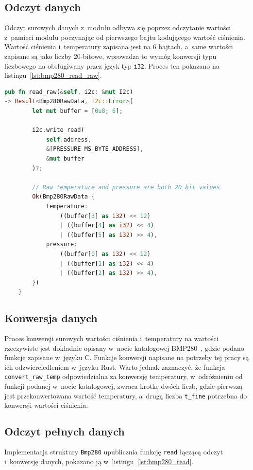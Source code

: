 \subsection*{Odczyt danych}
Odczyt surowych danych z~modułu odbywa się poprzez odczytanie wartości 
z~pamięci modułu poczynając od pierwszego bajtu kodującego wartość ciśnienia.
Wartość ciśnienia i~temperatury zapisana jest na 6 bajtach, a~same wartości
zapisane są jako liczby 20-bitowe, wprowadza to wymóg konwersji typu
liczbowego na obsługiwany przez język typ \texttt{i32}. Proces ten pokazano
na listingu~\ref{lst:bmp280_read_raw}.

\begin{lstlisting}[language=Rust, style=colouredRust, 
    caption={Odczyt surowych danych z modułu BMP280},
    label={lst:bmp280_read_raw}
]
pub fn read_raw(&self, i2c: &mut I2c) 
-> Result<Bmp280RawData, i2c::Error>{
        let mut buffer = [0u8; 6];

        i2c.write_read(
            self.address, 
            &[PRESSURE_MS_BYTE_ADDRESS], 
            &mut buffer
        )?;

        // Raw temperature and pressure are both 20 bit values
        Ok(Bmp280RawData { 
            temperature: 
                ((buffer[3] as i32) << 12) 
                | ((buffer[4] as i32) << 4) 
                | ((buffer[5] as i32) >> 4), 
            pressure: 
                ((buffer[0] as i32) << 12) 
                | ((buffer[1] as i32) << 4) 
                | ((buffer[2] as i32) >> 4),
        })
    }
\end{lstlisting}

\subsection*{Konwersja danych}
Proces konwersji surowych wartości ciśnienia i~temperatury na wartości 
rzeczywiste jest dokładnie opisany w~nocie katalogowej 
BMP280~\cite{bmp280_datasheet}, gdzie podano funkcje zapisane w~języku C. 
Funkcje konwersji napisane na potrzeby tej pracy są ich odzwierciedleniem
w~języku Rust.
Warto jednak zaznaczyć, że funkcja \texttt{convert\_raw\_temp} odpowiedzialna
za konwersję temperatury, w~odróżnieniu od funkcji podanej w~nocie katalogowej,
zwraca krotkę dwóch liczb, gdzie pierwszą jest przekonwertowana wartość
temperatury, a~drugą liczba \texttt{t\_fine} potrzebna do konwersji
wartości ciśnienia.

\subsection*{Odczyt pełnych danych}
Implementacja struktury \texttt{Bmp280} upublicznia funkcję \texttt{read}
łączącą odczyt i~konwersję danych, pokazano ją 
w~listingu~\ref{lst:bmp280_read}.

